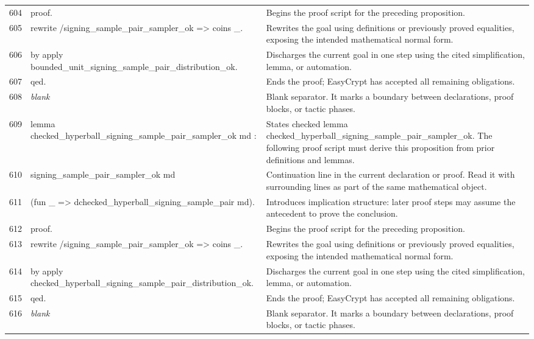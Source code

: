 \documentclass[10pt]{article}
\begin{document}
\begin{longtable}{r L{0.53\textwidth} L{0.37\textwidth}}
604 & {\ttfamily\scriptsize proof.} & Begins the proof script for the preceding proposition. \\
605 & {\ttfamily\scriptsize rewrite /signing\_sample\_pair\_sampler\_ok => coins \_.} & Rewrites the goal using definitions or previously proved equalities, exposing the intended mathematical normal form. \\
606 & {\ttfamily\scriptsize by apply bounded\_unit\_signing\_sample\_pair\_distribution\_ok.} & Discharges the current goal in one step using the cited simplification, lemma, or automation. \\
607 & {\ttfamily\scriptsize qed.} & Ends the proof; EasyCrypt has accepted all remaining obligations. \\
608 & {\ttfamily\scriptsize \emph{blank}} & Blank separator.  It marks a boundary between declarations, proof blocks, or tactic phases. \\
609 & {\ttfamily\scriptsize lemma checked\_hyperball\_signing\_sample\_pair\_sampler\_ok md :} & States checked lemma checked\_hyperball\_signing\_sample\_pair\_sampler\_ok.  The following proof script must derive this proposition from prior definitions and lemmas. \\
610 & {\ttfamily\scriptsize   signing\_sample\_pair\_sampler\_ok md} & Continuation line in the current declaration or proof.  Read it with surrounding lines as part of the same mathematical object. \\
611 & {\ttfamily\scriptsize     (fun \_ => dchecked\_hyperball\_signing\_sample\_pair md).} & Introduces implication structure: later proof steps may assume the antecedent to prove the conclusion. \\
612 & {\ttfamily\scriptsize proof.} & Begins the proof script for the preceding proposition. \\
613 & {\ttfamily\scriptsize rewrite /signing\_sample\_pair\_sampler\_ok => coins \_.} & Rewrites the goal using definitions or previously proved equalities, exposing the intended mathematical normal form. \\
614 & {\ttfamily\scriptsize by apply checked\_hyperball\_signing\_sample\_pair\_distribution\_ok.} & Discharges the current goal in one step using the cited simplification, lemma, or automation. \\
615 & {\ttfamily\scriptsize qed.} & Ends the proof; EasyCrypt has accepted all remaining obligations. \\
616 & {\ttfamily\scriptsize \emph{blank}} & Blank separator.  It marks a boundary between declarations, proof blocks, or tactic phases. \\

\end{longtable}
\end{document}
